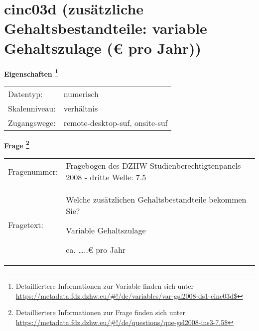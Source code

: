 
    \setcounter{footnote}{0}

    \vspace*{-1.8cm}
	\section{cinc03d (zusätzliche Gehaltsbestandteile: variable Gehaltszulage (€ pro Jahr))}
	\label{section:cinc03d}



    \vspace*{0.5cm}
    \noindent\textbf{Eigenschaften
	\footnote{Detailliertere Informationen zur Variable finden sich unter
		\url{https://metadata.fdz.dzhw.eu/\#!/de/variables/var-gsl2008-ds1-cinc03d$}}}\\
	\begin{tabularx}{\hsize}{@{}lX}
	Datentyp: & numerisch \\
	Skalenniveau: & verhältnis \\
	Zugangswege: &
	  remote-desktop-suf, 
	  onsite-suf
 \\
    \end{tabularx}



				\vspace*{0.5cm}
                \noindent\textbf{Frage
	                \footnote{Detailliertere Informationen zur Frage finden sich unter
		              \url{https://metadata.fdz.dzhw.eu/\#!/de/questions/que-gsl2008-ins3-7.5$}}}\\
				\begin{tabularx}{\hsize}{@{}lX}
					Fragenummer: &
					  Fragebogen des DZHW-Studienberechtigtenpanels 2008 - dritte Welle:
					  7.5
 \\
					Fragetext: & Welche zusätzlichen Gehaltsbestandteile bekommen Sie?\par  Variable Gehaltszulage\par  ca. …..€ pro Jahr \\
				\end{tabularx}





